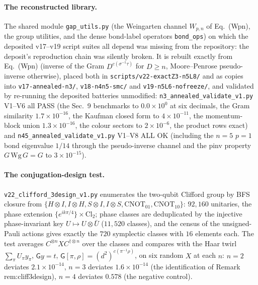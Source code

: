\documentclass[aps,prx,reprint,superscriptaddress,nobibnotes,longbibliography]{revtex4-2}
\begin{document}
\paragraph{The reconstructed library.}
The shared module \texttt{gap\_utils.py} (the Weingarten channel
$W_{p,n}$ of Eq.~(Wpn), the group utilities, and the dense bond-label
operators \texttt{bond\_ops}) on which the deposited v17--v19 script
suites all depend was missing from the repository: the deposit's
reproduction chain was silently broken.  It is rebuilt exactly from
Eq.~(Wpn) (inverse of the Gram $D^{c(\sigma^{-1}\tau)}$ for $D\ge n$,
Moore--Penrose pseudo-inverse otherwise), placed both in
\texttt{scripts/v22-exactZ3-n5L8/} and as copies into
\texttt{v17-annealed-n3/}, \texttt{v18-n4n5-smc/} and
\texttt{v19-n5L6-nofreeze/}, and validated by re-running the deposited
batteries unmodified: \texttt{n3\_annealed\_validate\_v1.py} V1--V6 all
PASS (the Sec.~9 benchmarks to $0.0\times10^{0}$ at six decimals, the
Gram similarity $1.7\times10^{-16}$, the Kaufman closed form to
$4\times10^{-11}$, the momentum-block union $1.3\times10^{-16}$, the
colour sectors to $2\times10^{-6}$, the product rows exact) and
\texttt{n45\_annealed\_validate\_v1.py} V1--V8 ALL OK (including the
$n=5$ $p=1$ bond eigenvalue $1/14$ through the pseudo-inverse channel and
the pinv property $G\,\mathrm{Wg}\,G=G$ to $3\times10^{-15}$).

\paragraph{The conjugation-design test.}
\texttt{v22\_clifford\_3design\_v1.py} enumerates the two-qubit Clifford
group by BFS closure from $\{H\otimes I, I\otimes H, S\otimes I,
I\otimes S, \mathrm{CNOT}_{01}, \mathrm{CNOT}_{10}\}$: $92{,}160$
unitaries, the phase extension $\{e^{ik\pi/4}\}\times\mathrm{Cl}_2$;
phase classes are deduplicated by the injective phase-invariant key
$U\mapsto U\otimes\bar U$ ($11{,}520$ classes), and the census of the
unsigned-Pauli actions gives exactly the $720$ symplectic classes with
$16$ elements each.  The test averages $C^{\otimes n}XC^{\dagger\otimes
n}$ over the classes and compares with the Haar twirl
$\sum_\pi U_\pi y_\pi$, $\mathsf Gy=t$,
$\mathsf G[\pi,\rho]=(d^2)^{c(\pi^{-1}\rho)}$, on six random $X$ at each
$n$: $n=2$ deviates $2.1\times10^{-14}$, $n=3$ deviates
$1.6\times10^{-14}$ (the identification of Remark rem:cliff3design),
$n=4$ deviates $0.578$ (the negative control).
\end{document}
